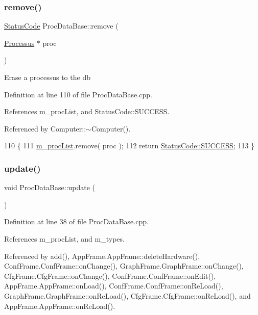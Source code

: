 \subsubsection{\texorpdfstring{remove()}{remove()}}
{\footnotesize\ttfamily \hyperlink{classStatusCode}{Status\+Code} Proc\+Data\+Base\+::remove (\begin{DoxyParamCaption}\item[{\hyperlink{classProcessus}{Processus} $\ast$}]{proc }\end{DoxyParamCaption})}

Erase a processus to the db 

Definition at line 110 of file Proc\+Data\+Base.\+cpp.



References m\+\_\+proc\+List, and Status\+Code\+::\+S\+U\+C\+C\+E\+SS.



Referenced by Computer\+::$\sim$\+Computer().


\begin{DoxyCode}
110                                                   \{
111   \hyperlink{classProcDataBase_a9b7458b811b826c5d264b436c7a391c4}{m\_procList}.remove( proc );
112   \textcolor{keywordflow}{return} \hyperlink{classStatusCode_a6f565cbeadc76d14c72f047e5e85eb4badd0da38d3ba0d922efd1f4619bc37ad8}{StatusCode::SUCCESS};
113 \}
\end{DoxyCode}
\mbox{\label{classProcDataBase_a604959db08c3871d863a799cc4e1d5f4}} 
\subsubsection{\texorpdfstring{update()}{update()}}
{\footnotesize\ttfamily void Proc\+Data\+Base\+::update (\begin{DoxyParamCaption}{ }\end{DoxyParamCaption})}



Definition at line 38 of file Proc\+Data\+Base.\+cpp.



References m\+\_\+proc\+List, and m\+\_\+types.



Referenced by add(), App\+Frame.\+App\+Frame\+::delete\+Hardware(), Conf\+Frame.\+Conf\+Frame\+::on\+Change(), Graph\+Frame.\+Graph\+Frame\+::on\+Change(), Cfg\+Frame.\+Cfg\+Frame\+::on\+Change(), Conf\+Frame.\+Conf\+Frame\+::on\+Edit(), App\+Frame.\+App\+Frame\+::on\+Load(), Conf\+Frame.\+Conf\+Frame\+::on\+Re\+Load(), Graph\+Frame.\+Graph\+Frame\+::on\+Re\+Load(), Cfg\+Frame.\+Cfg\+Frame\+::on\+Re\+Load(), and App\+Frame.\+App\+Frame\+::on\+Re\+Load().


